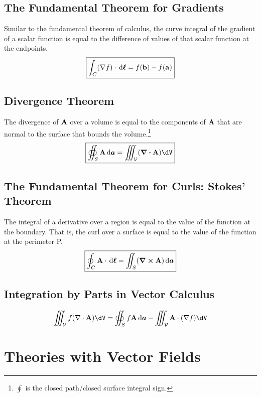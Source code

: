     \subsection*{The Fundamental Theorem for Gradients}
        Similar to the fundamental theorem of calculus, the curve integral of the gradient of a scalar function is equal to the difference of values of that scalar function at the endpoints. 
        \begin{equation}
            \boxed{\int_C(\nabla f)\cdot\dl=f(\mathbf{b})-f(\mathbf{a})}
        \end{equation}
    \subsection*{Divergence Theorem}
        The divergence of \(\vb{A}\) over a volume is equal to the components of \(\vb{A}\) that are normal to the surface that bounds the volume.\footnote{\(\oint\) is the closed path/closed surface integral sign.}
        \begin{align}
            \boxed{\oiint_S \vb{A} \da =\iiint_{\mathcal{V}} (\div\vb{A})\dV } 
        \end{align}
    \subsection*{The Fundamental Theorem for Curls: Stokes' Theorem}
        The integral of a derivative over a region is equal to the value of the function at the boundary. That is, the curl over a surface is equal to the value of the function at the perimeter P. 
        \begin{align}
            \boxed{\oint_C \vb{A}\cdot\dl=\iint_{S} (\curl \vb{A}) \da} 
        \end{align}
        \subsection*{Integration by Parts in Vector Calculus}
        \begin{align*}
        \iiint_{\mathcal{V}} f(\nabla \cdot \vb{A})\dV 
        =
        \oiint_S f\vb{A}\da
        -\iiint_{\mathcal{V}} \vb{A} \cdot (\nabla f)\dV 
        \end{align*}


        \newpage

\section{Theories with Vector Fields \label{vectorfields}}
